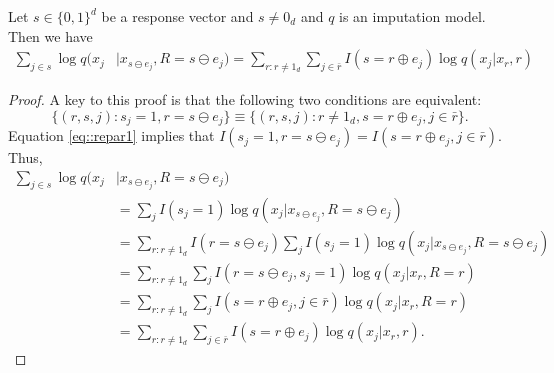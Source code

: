 \documentclass[10pt,a4paper]{amsart}
\begin{document}
\begin{lemma}
Let $s\in\{0,1\}^d$ be a response vector and $s \neq 0_d$
and $q$ is an imputation model.
Then we have
\begin{align*}
\sum_{j \in s} \log q(x_j &|x_{s\ominus e_j} , R = s\ominus e_j)
=\sum_{r:r\neq 1_d}    \sum_{j \in \bar r} I(s = r\oplus e_j)\log q(x_j |x_{r} , r) 
\end{align*}
\label{lem::repar}
\end{lemma}

\begin{proof}

A key to this proof is that the following two conditions are equivalent:
\begin{equation}
\{(r,s,j): s_j = 1, r=s\ominus e_j\} \equiv \{(r,s,j):r\neq 1_d, s = r\oplus e_j, j \in \bar r\}.
\label{eq::repar1}
\end{equation}
Equation \eqref{eq::repar1} implies that 
$I(s_j=1, r=s\ominus e_j) = I(s = r\oplus e_j, j\in \bar r)$. 
Thus,
\begin{align*}
\sum_{j \in s} \log q(x_j &|x_{s\ominus e_j} , R = s\ominus e_j)\\
& = \sum_{j } I(s_j = 1)\log q(x_j |x_{s\ominus e_j} , R = s\ominus e_j)\\
& = \sum_{r:r\neq 1_d} I(r=s\ominus e_j)\sum_{j } I(s_j = 1)\log q(x_j |x_{s\ominus e_j} , R = s\ominus e_j)\\
& = \sum_{r:r\neq 1_d}\sum_{j} I(r=s\ominus e_j, s_j = 1)\log q(x_j |x_{r} , R = r)\\
& = \sum_{r:r\neq 1_d}\sum_{j} I(s = r\oplus e_j, j\in \bar r)\log q(x_j |x_{r} , R = r)\\
& = \sum_{r:r\neq 1_d}    \sum_{j \in \bar r} I(s = r\oplus e_j)\log q(x_j |x_{r} , r) .
\end{align*}




\end{proof}
\end{document}
